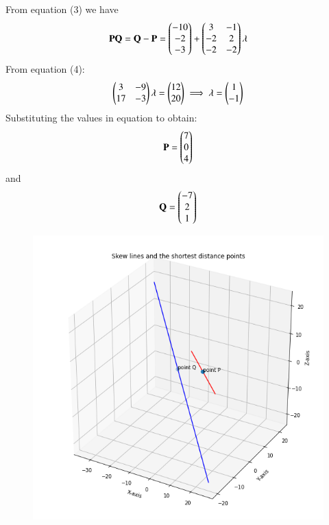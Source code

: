 \documentclass[journal,12pt,twocolumn]{IEEEtran}
\begin{document}
From equation (3) we have 
\begin{align}
	\mathbf{PQ} = \mathbf{Q - P} = \begin{pmatrix}-10\\-2\\-3\end{pmatrix} + \begin{pmatrix}3 & -1 \\ -2 & 2 \\ -2 & -2\end{pmatrix}\mathbf{\lambda}
\end{align}
From equation (4):
\begin{align}
	\begin{pmatrix}3 & -9 \\ 17 & -3\end{pmatrix}\mathbf{\lambda} = \begin{pmatrix}12\\20\end{pmatrix}
	\implies
	\mathbf{\lambda} = \begin{pmatrix}1\\-1\end{pmatrix}
\end{align}
Substituting the values in equation to obtain:
\begin{align*}
	\mathbf{P} = \begin{pmatrix}7\\0\\4\end{pmatrix}
\end{align*}
and
\begin{align*}
	\mathbf{Q} = \begin{pmatrix}-7\\2\\1\end{pmatrix}
\end{align*}
\begin{figure}[htbp]
\centering
	\includegraphics[width=\columnwidth]{skew_lines_plot.png}
	\caption{}
\end{figure}
\end{document}
